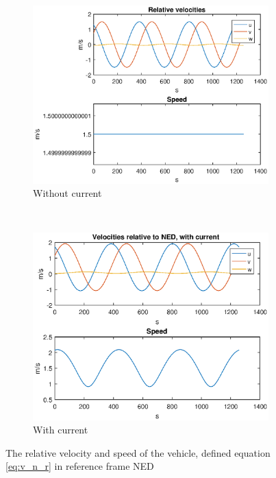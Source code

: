 \begin{figure}[!ht]
	\centering
	\begin{subfigure}[b]{0.45\textwidth}
		\includegraphics[width=\textwidth]{figures/4_vel}
		\caption{Without current}
	\end{subfigure}
	~ %
	\begin{subfigure}[b]{0.45\textwidth}
		\includegraphics[width=\textwidth]{figures/4_vel_ned_with_cur}
		\caption{With current}
	\end{subfigure}
	\caption{The relative velocity and speed of the vehicle, defined equation \eqref{eq:v_n_r} in reference frame NED}
	\label{fig:4_vel}
\end{figure}


